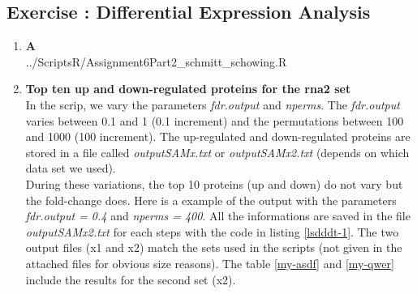 \documentclass[10pt,a4paper]{article}
\newcommand{\exercise}[1]
{
  \stepcounter{subsection}
  \subsection*{Exercise \thesubsection: #1}

}
\begin{document}
\newpage
\exercise{Differential Expression Analysis}
\begin{enumerate}
	
	\item \textbf{A}\\

		 {../ScriptsR/Assignment6Part2\string_schmitt\string_schowing.R}
	
	\item \textbf{Top ten up and down-regulated proteins for the rna2 set}\\
	In the scrip, we vary the parameters \textit{fdr.output} and \textit{nperms}. The \textit{fdr.output} varies between 0.1 and 1 (0.1 increment) and the permutations between 100 and 1000 (100 increment). The up-regulated and down-regulated proteins are stored in a file called \textit{outputSAMx.txt} or \textit{outputSAMx2.txt} (depends on which data set we used).\\
	
	During these variations, the top 10 proteins (up and down) do not vary but the fold-change does. Here is a example of the output with the parameters \textit{fdr.output = 0.4} and \textit{nperms = 400}. All the informations are saved in the file \textit{outputSAMx2.txt} for each steps with the code in listing \ref{lsdddt-1}. The two output files (x1 and x2) match the sets used in the scripts (not given in the attached files for obvious size reasons). The table \ref{my-asdf} and \ref{my-qwer} include the results for the second set (x2).
	
	
	

\end{enumerate}
\end{document}
